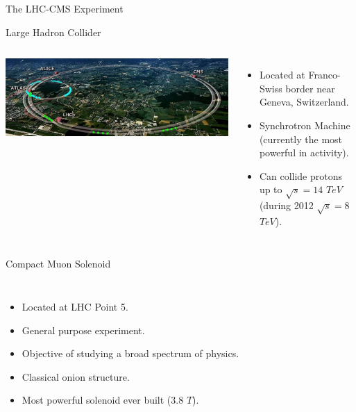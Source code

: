 \documentclass[8pt]{beamer}
\begin{document}
\begin{frame}{The LHC-CMS Experiment}
 
  \begin{block}{Large Hadron Collider}

    \begin{columns}

      \column[t]{5.5cm}
      \begin{center}
        \includegraphics[width=1.00\textwidth]{img/LHCMap.jpg} 
      \end{center}

      \column[t]{5.5cm}

      \begin{itemize}
        \item Located at Franco-Swiss border near Geneva, Switzerland.
        \item Synchrotron Machine (currently the most powerful in activity).
        \item Can collide protons up to $\sqrt{s}=14$ $TeV$ (during 2012 $\sqrt{s}=8$ $TeV$).
      \end{itemize}

    \end{columns}

  \end{block}

  \begin{block}{Compact Muon Solenoid}

    \begin{columns}
      \column[t]{6.5cm}

      \begin{itemize}
        \item Located at LHC Point 5.
        \item General purpose experiment.
        \item Objective of studying a broad spectrum of physics.
        \item Classical onion structure.
        \item Most powerful solenoid ever built (3.8 $T$).
      \end{itemize}  


\end{columns}
\end{block}
\end{frame}
\end{document}
